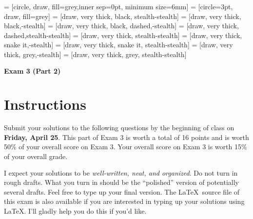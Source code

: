 \documentclass[11pt]{article}
\theoremstyle{definition}
\begin{document}
 = [circle, draw, fill=grey,inner sep=0pt, minimum size=6mm]
 = [circle=3pt, draw, fill=grey]
 = [draw, very  thick, black, stealth-stealth]
 = [draw, very  thick, black,-stealth]
 = [draw, very  thick, black, dashed,-stealth]
 = [draw, very thick, dashed,stealth-stealth]
 = [draw, very thick, stealth-stealth]
 = [draw, very thick, snake it,-stealth]
 = [draw, very thick, snake it, stealth-stealth]
 = [draw, very thick, grey,-stealth]
 = [draw, very thick, grey, stealth-stealth]

\begin{center}

{\Large\bf Exam 3 (Part 2)}

\bigskip

  
  \bigskip
  

\end{center}

\section*{Instructions}

Submit your solutions to the following questions by the beginning of class on \textbf{Friday, April 25}. This part of Exam 3 is worth a total of 16 points and is worth 50\% of your overall score on Exam 3. Your overall score on Exam 3 is worth 15\% of your overall grade.

\bigskip

I expect your solutions to be \emph{well-written, neat, and organized}.  Do not turn in rough drafts.  What you turn in should be the ``polished'' version of potentially several drafts.  Feel free to type up your final version.  The \LaTeX\ source file of this exam is also available if you are interested in typing up your solutions using \LaTeX.  I'll gladly help you do this if you'd like.

\bigskip
\end{document}
